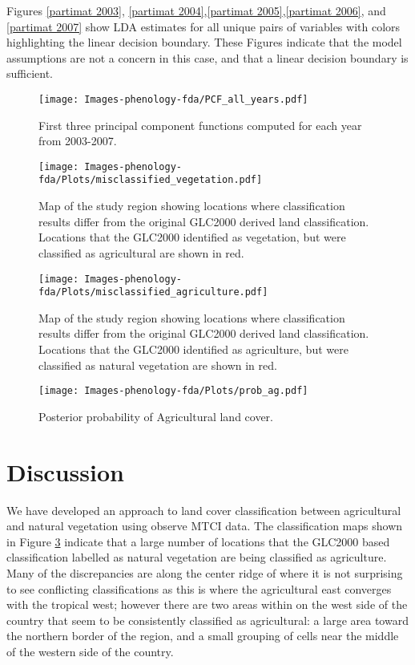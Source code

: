 Figures \ref{partimat 2003}, \ref{partimat 2004},\ref{partimat 2005},\ref{partimat 2006}, and \ref{partimat 2007} show LDA estimates for all unique pairs of variables with colors highlighting the linear decision boundary. These Figures indicate that the model assumptions are not a concern in this case, and that a linear decision boundary is sufficient. 

\begin{figure}
	[htbp] \centering 
	\texttt{[image: Images-phenology-fda/PCF\_all\_years.pdf]} \caption{First three principal component functions computed for each year from 2003-2007. } \label{fig:pcf all years} 
\end{figure}

\begin{figure}
	[htbp] \centering 
	\texttt{[image: Images-phenology-fda/Plots/misclassified\_vegetation.pdf]} \caption{Map of the study region showing locations where classification results differ from the original GLC2000 derived land classification. Locations that the GLC2000 identified as vegetation, but were classified as agricultural are shown in red.   } 
	\label{fig:classification map} 
\end{figure}

\begin{figure}
	[htbp] \centering 
	\texttt{[image: Images-phenology-fda/Plots/misclassified\_agriculture.pdf]} \caption{Map of the study region showing locations where classification results differ from the original GLC2000 derived land classification. Locations that the GLC2000 identified as agriculture, but were classified as natural vegetation are shown in red.} 
	\label{fig:classification map} 
\end{figure}

\begin{figure}
	[htbp] \centering 
	\texttt{[image: Images-phenology-fda/Plots/prob\_ag.pdf]} \caption{ Posterior probability of Agricultural land cover. } 
	\label{fig:probability map} 
\end{figure}


\label{sec:results}


\section{Discussion} 
We have developed an approach to land cover classification between agricultural and natural vegetation using observe MTCI data. The classification maps shown in Figure \ref{fig:classification map} indicate that a large number of locations that the GLC2000 based classification labelled as natural vegetation are being classified as agriculture. Many of the discrepancies are along the center ridge of where it is not surprising to see conflicting classifications as this is where the agricultural east converges with the tropical west; however there are two areas within on the west side of the country that seem to be consistently classified as agricultural: a large area toward the northern border of the region, and a small grouping of cells near the middle of the western side of the country. 

